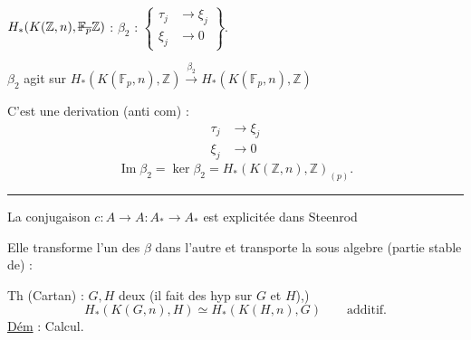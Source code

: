 $H_*(K(\mathbb Z,n),\deleted{\mathbb F_p}\mathbb Z)$ : $\beta_2$ :
$\left\{\begin{aligned}\tau_j&\longrightarrow\xi_j\\ \xi_j&\longrightarrow0\end{aligned}\right\}$.

$\beta_2$ agit sur $H_*(K(\mathbb F_p,n),\mathbb Z)\xrightarrow{\beta_2}H_*(K(\mathbb F_p,n),\mathbb Z)$

C'est une derivation (anti com) :
\[
\begin{aligned}\tau_j&\longrightarrow\xi_j\\ \xi_j&\longrightarrow0\end{aligned}
\]
\[
\operatorname{Im}\beta_2=\ker\beta_2=H_*(K(\mathbb Z,n),\mathbb Z)_{(p)} .
\]
\begin{center}\rule{1.2cm}{0.3pt}\end{center}
La conjugaison $c:A\longrightarrow A$\quad $:A_*\longrightarrow A_*$ est explicitée dans Steenrod

Elle transforme l'un des $\beta$ dans l'autre et transporte la sous algebre (partie stable de) :

Th (Cartan) : $G,H$ deux   (il fait des hyp sur $G$ et $H$),)
\[
H_*(K(G,n),H)\simeq H_*(K(H,n),G)\qquad\text{additif.}
\]
\uline{Dém} : Calcul.

